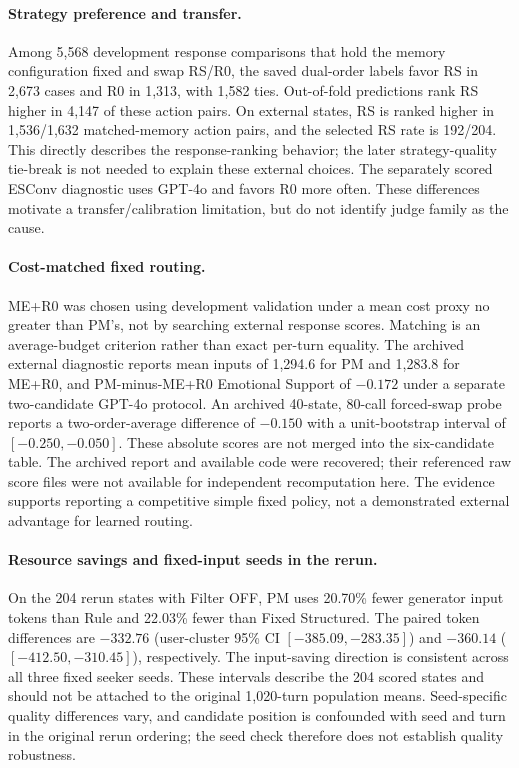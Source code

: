 \paragraph{Strategy preference and transfer.}
Among 5,568 development response comparisons that hold the memory
configuration fixed and swap RS/R0, the saved dual-order labels favor RS
in 2,673 cases and R0 in 1,313, with 1,582 ties. Out-of-fold predictions
rank RS higher in 4,147 of these action pairs. On external states, RS is
ranked higher in 1,536/1,632 matched-memory action pairs, and the selected
RS rate is 192/204. This directly describes the response-ranking behavior;
the later strategy-quality tie-break is not needed to explain these
external choices. The separately scored ESConv diagnostic uses GPT-4o
and favors R0 more often. These differences motivate a transfer/calibration
limitation, but do not identify judge family as the cause.

\paragraph{Cost-matched fixed routing.}
ME+R0 was chosen using development validation under a mean cost proxy no
greater than PM's, not by searching external response scores. Matching is
an average-budget criterion rather than exact per-turn equality. The
archived external diagnostic reports mean inputs of 1,294.6 for PM and
1,283.8 for ME+R0, and PM-minus-ME+R0 Emotional Support of $-0.172$ under a
separate two-candidate GPT-4o protocol. An archived 40-state, 80-call
forced-swap probe reports a two-order-average difference of $-0.150$
with a unit-bootstrap interval of $[-0.250,-0.050]$.
These absolute scores are not merged into the six-candidate table.
The archived report and available code were recovered; their referenced
raw score files were not available for independent recomputation here.
The evidence supports reporting a competitive simple fixed policy,
not a demonstrated external advantage for learned routing.

\paragraph{Resource savings and fixed-input seeds in the rerun.}
On the 204 rerun states with Filter OFF, PM uses 20.70\% fewer generator
input tokens than Rule and 22.03\% fewer than Fixed Structured.
The paired token differences are $-332.76$ (user-cluster 95\% CI
$[-385.09,-283.35]$) and $-360.14$ ($[-412.50,-310.45]$), respectively.
The input-saving direction is consistent across all three fixed seeker
seeds. These intervals describe the 204 scored states and should not be
attached to the original 1,020-turn population means. Seed-specific quality
differences vary, and candidate position is confounded with seed and turn
in the original rerun ordering; the seed check therefore does not establish
quality robustness.

